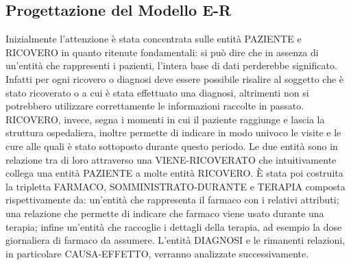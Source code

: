 \documentclass{article}
\begin{document}
\clearpage
\subsection{Progettazione del Modello E-R}
Inizialmente l'attenzione è stata concentrata sulle entità PAZIENTE e RICOVERO
in quanto ritenute fondamentali: si può dire che in assenza di un'entità che
rappresenti i pazienti, l'intera base di dati perderebbe significato.  Infatti
per ogni ricovero o diagnosi deve essere possibile risalire al soggetto che è
stato ricoverato o a cui è stata effettuato una diagnosi, altrimenti non si
potrebbero utilizzare correttamente le informazioni raccolte in passato.
RICOVERO, invece, segna i momenti in cui il paziente raggiunge e lascia la
struttura ospedaliera, inoltre permette di indicare in modo univoco le visite e
le cure alle quali è stato sottoposto durante questo periodo.  Le due entità
sono in relazione tra di loro attraverso una VIENE-RICOVERATO che intuitivamente
collega una entità PAZIENTE a molte entità RICOVERO.  È stata poi costruita la
tripletta FARMACO, SOMMINISTRATO-DURANTE e TERAPIA composta rispettivamente da:
un'entità che rappresenta il farmaco con i relativi attributi; una relazione che
permette di indicare che farmaco viene usato durante una terapia; infine
un'entità che raccoglie i dettagli della terapia, ad esempio la dose giornaliera
di farmaco da assumere.  L'entità DIAGNOSI e le rimanenti relazioni, in
particolare CAUSA-EFFETTO, verranno analizzate successivamente.
\end{document}
